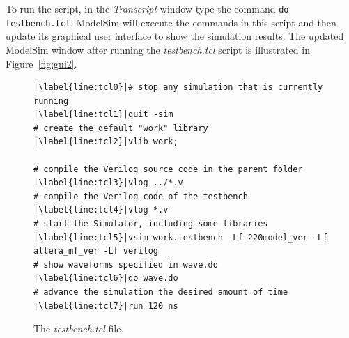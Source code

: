 \documentclass[11pt, twoside, pdftex]{article}
\begin{document}
\noindent
To run the script, in the {\it Transcript} window type the command
\texttt{do testbench.tcl}. ModelSim will execute the commands in this script and then
update its graphical user interface to show the simulation results. 
The updated ModelSim window after running the {\it testbench.tcl} script is illustrated 
in Figure~\ref{fig:gui2}.

\lstset{language=Tcl,numbers=left,escapechar=|}
\begin{figure}[b]
\begin{center}
\begin{minipage}[t]{15 cm}
\begin{lstlisting}[name=tcl]
|\label{line:tcl0}|# stop any simulation that is currently running
|\label{line:tcl1}|quit -sim
# create the default "work" library
|\label{line:tcl2}|vlib work;

# compile the Verilog source code in the parent folder
|\label{line:tcl3}|vlog ../*.v
# compile the Verilog code of the testbench
|\label{line:tcl4}|vlog *.v
# start the Simulator, including some libraries
|\label{line:tcl5}|vsim work.testbench -Lf 220model_ver -Lf altera_mf_ver -Lf verilog
# show waveforms specified in wave.do
|\label{line:tcl6}|do wave.do
# advance the simulation the desired amount of time
|\label{line:tcl7}|run 120 ns
\end{lstlisting}
\end{minipage}
\caption{The {\it testbench.tcl} file.}
\label{fig:tcl}
\end{center}
\end{figure}
\end{document}
